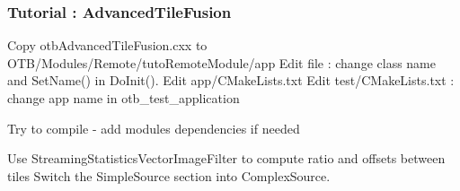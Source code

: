 \documentclass[8pt]{beamer}
\begin{document}
\begin{frame}
\frametitle{Tutorial : AdvancedTileFusion}

Copy otbAdvancedTileFusion.cxx to OTB/Modules/Remote/tutoRemoteModule/app
Edit file : change class name and SetName() in DoInit().
Edit app/CMakeLists.txt
Edit test/CMakeLists.txt : change app name in otb_test_application

Try to compile
   - add modules dependencies if needed


Use StreamingStatisticsVectorImageFilter to compute ratio and offsets between tiles
Switch the SimpleSource section into ComplexSource.

\end{frame}
\end{document}
